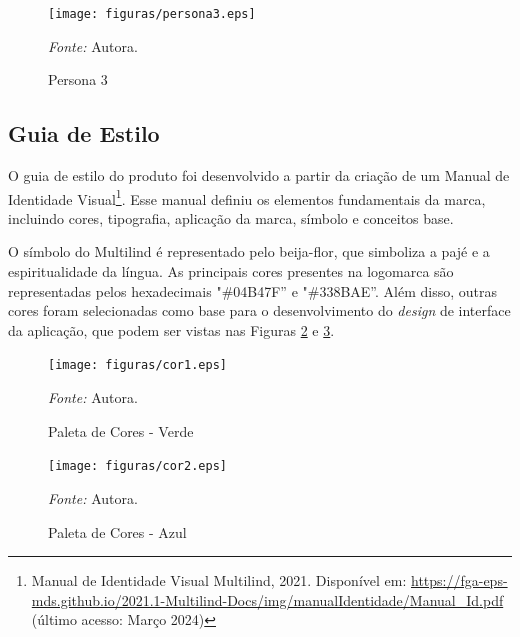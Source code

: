 \pagebreak

\begin{figure}[h!]
	\centering
	\caption{Persona 3}
	\begin{adjustbox}{center}
		\texttt{[image: figuras/persona3.eps]}
	\end{adjustbox}
	\begin{tablenotes}[flushleft]
		\centering
		\item \textit{Fonte:} Autora.
	\end{tablenotes}
	\label{fig15}
\end{figure}

\subsection{Guia de Estilo}
\label{Guia de Estilo}
O guia de estilo do produto foi desenvolvido a partir da criação de um Manual de Identidade Visual\footnote{Manual de Identidade Visual Multilind, 2021. Disponível
em: \url{https://fga-eps-mds.github.io/2021.1-Multilind-Docs/img/manualIdentidade/Manual_Id.pdf} (último acesso: Março 2024)}. Esse manual definiu os elementos fundamentais da marca, incluindo cores, tipografia, aplicação da marca, símbolo e conceitos base.

O símbolo do Multilind é representado pelo beija-flor, que simboliza a pajé e a espiritualidade da língua. As principais cores presentes na logomarca são representadas pelos hexadecimais "\#04B47F'' e "\#338BAE''. Além disso, outras cores foram selecionadas 
como base para o desenvolvimento do \textit{design} de interface da aplicação, que podem ser vistas nas Figuras \ref{fig16} e \ref{fig17}.

\begin{figure}[h!]
	\centering
	\caption{Paleta de Cores - Verde}
	\begin{adjustbox}{center}
		\texttt{[image: figuras/cor1.eps]}
	\end{adjustbox}
	\begin{tablenotes}[flushleft]
		\centering
		\item \textit{Fonte:} Autora.
	\end{tablenotes}
	\label{fig16}
\end{figure}

\begin{figure}[h!]
	\centering
	\caption{Paleta de Cores - Azul}
	\begin{adjustbox}{center}
		\texttt{[image: figuras/cor2.eps]}
	\end{adjustbox}
	\begin{tablenotes}[flushleft]
		\centering
		\item \textit{Fonte:} Autora.
	\end{tablenotes}
	\label{fig17}
\end{figure}

